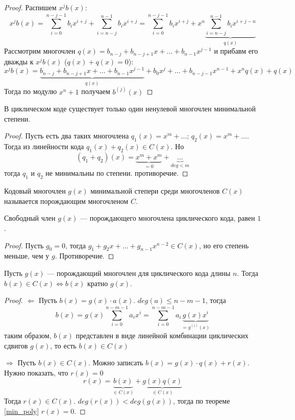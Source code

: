 \begin{proof}
Распишем $x^j b(x)$:
$$x^j b(x) = \sum\limits_{i=0}^{n-j-1} b_i x^{i+j} + \sum\limits_{i=n-j}^{n-1} b_i x^{i+j}
   = \sum\limits_{i=0}^{n-j-1} b_i x^{i+j} + x^n 
     \underbrace{\sum\limits_{i=n-j}^{n-1} b_i x^{i+j-n}}_{q(x)}$$
Рассмотрим многочлен $q(x) = b_{n-j} + b_{n-j+1} x + \ldots + b_{n-1} x^{j-1}$ и
прибавм его дважды к $x^j b(x)$ ($q(x) + q(x) = 0$):
$$x^j b(x) = \underbrace{ b_{n-j} + b_{n-j+1} x + \ldots + b_{n-1} x^{j-1}}_{q(x)}
           + b_0 x^j + \ldots + b_{n-j-1} x^{n-1} + x^n q(x) + q(x)$$
Тогда по модулю $x^n + 1$ получаем $b^{(j)}(x)$
\end{proof}

\begin{theorem}
\label{min_poly}
В циклическом коде существует только один ненулевой многочлен минимальной
степени.
\end{theorem}

\begin{proof}
Пусть есть два таких многочлена $q_1(x) = x^m + \ldots$; $q_2(x) = x^m + \ldots$.
Тогда из линейности кода $q_1(x) + q_2(x) \in C(x)$. Но 
$$(q_1 + q_2)(x) = \underbrace{x^m + x^m}_{=0} + \underbrace{\ldots}_{deg < m}$$
тогда $q_1$ и $q_2$ не минимальны по степени. противоречие.
\end{proof}

\begin{definition}
Кодовый многочлен $g(x)$ минимальной степери среди многочленов $C(x)$ называется
порождающим многочленом $C$.
\end{definition}

\begin{theorem}
Свободный член $g(x)$ --- порождающего многочлена циклического кода, равен $1$.
\end{theorem}

\begin{proof}
Пусть $g_0 = 0$, тогда $g_1 + g_2 x + \ldots + g_{n-1} x^{n-2} \in C(x)$, но его
степень меньше, чем у $g$. Противоречие.
\end{proof}

\begin{theorem}
Пусть $g(x)$ --- порождающий многочлен для циклического кода длины $n$.
Тогда $b(x) \in C(x) \iff b(x) \text{ кратно } g(x)$.
\end{theorem}

\begin{proof}
$\Leftarrow$ Пусть $b(x) = g(x) \cdot a(x)$. $deg(a) \le n-m-1$, тогда
  $$b(x) = g(x) \sum\limits_{i=0}^{n-m-1} a_i x^i =  
  \sum\limits_{i=0}^{n-m-1} a_i \underbrace{g(x) x^i}_{=g^{(i)}(x)}$$
таким образом, $b(x)$ представлен в виде линейной комбинации циклических
сдвигов $g(x)$, то есть $b(x) \in C(x)$

$\Rightarrow$ Пусть $b(x) \in C(x)$. Можно записать $b(x) = g(x) \cdot q(x) + r(x)$.
Нужно показать, что $r(x) = 0$
$$r(x) = \underbrace{b(x)}_{\in C(x)} + \underbrace{g(x) q(x)}_{\in C(x)}$$
Тогда $r(x) \in C(x)$. $deg(r(x)) < deg(g(x))$, тогда по теореме \ref{min_poly}
$r(x) = 0$.
\end{proof}


